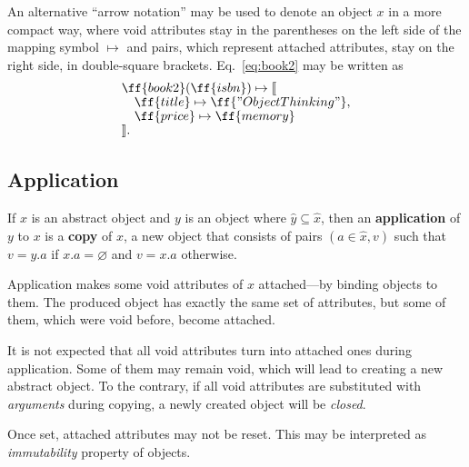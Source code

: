 An alternative ``arrow notation'' may be used to denote an object \(x\) in a more
compact way, where void attributes stay in the parentheses on the left side of the
mapping symbol \(\mapsto\) and pairs,
which represent attached attributes, stay on the right side, in double-square brackets.
Eq.~\ref{eq:book2} may be written as
\begin{equation}\label{eq:book2-compact}
\begin{split}
& \ff{book2}(\ff{isbn}) \mapsto \llbracket \br
& \quad \ff{title} \mapsto \ff{"Object Thinking"}, \br
& \quad \ff{price} \mapsto \ff{memory} \br
& \rrbracket. \\
\end{split}
\end{equation}

\subsection{Application}

\begin{definition}\label{def:application}
If \(x\) is an abstract object and \(y\) is an object
  where \(\hat{y}\subseteq\hat{x}\),
  then an \textbf{application} of \(y\) to \(x\) is
  a \textbf{copy} of \(x\), a new object that consists of pairs \((a\in\hat{x},v)\) such that
  \(v=y.a\) if \(x.a=\varnothing\) and \(v=x.a\) otherwise.
\end{definition}

Application makes some void attributes of \(x\) attached---by binding objects to them.
The produced object has exactly the same set of attributes, but some of them,
which were void before, become attached.

It is not expected that all void attributes turn into attached ones during application.
Some of them may remain void, which will lead
to creating a new abstract object. To the contrary,
if all void attributes are substituted with \emph{arguments} during copying,
a newly created object will be \emph{closed}.

Once set, attached attributes may not be reset.
This may be interpreted as \emph{immutability} property of objects.

